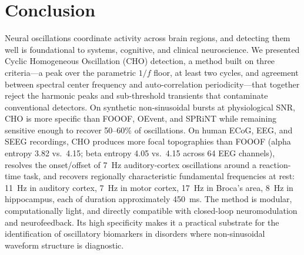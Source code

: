 \documentclass[11pt]{article}
\begin{document}
\section{Conclusion}

Neural oscillations coordinate activity across brain regions, and detecting them well is foundational to systems, cognitive, and clinical neuroscience. We presented Cyclic Homogeneous Oscillation (CHO) detection, a method built on three criteria---a peak over the parametric $1/f$ floor, at least two cycles, and agreement between spectral center frequency and auto-correlation periodicity---that together reject the harmonic peaks and sub-threshold transients that contaminate conventional detectors. On synthetic non-sinusoidal bursts at physiological SNR, CHO is more specific than FOOOF, OEvent, and SPRiNT while remaining sensitive enough to recover 50--60\% of oscillations. On human ECoG, EEG, and SEEG recordings, CHO produces more focal topographies than FOOOF (alpha entropy 3.82 vs.~4.15; beta entropy 4.05 vs.~4.15 across 64 EEG channels), resolves the onset/offset of 7~Hz auditory-cortex oscillations around a reaction-time task, and recovers regionally characteristic fundamental frequencies at rest: 11~Hz in auditory cortex, 7~Hz in motor cortex, 17~Hz in Broca's area, 8~Hz in hippocampus, each of duration approximately 450~ms. The method is modular, computationally light, and directly compatible with closed-loop neuromodulation and neurofeedback. Its high specificity makes it a practical substrate for the identification of oscillatory biomarkers in disorders where non-sinusoidal waveform structure is diagnostic.


\end{document}
